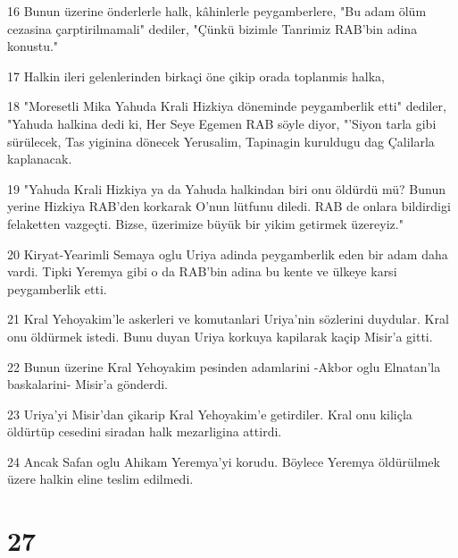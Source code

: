 \par 16 Bunun üzerine önderlerle halk, kâhinlerle peygamberlere, "Bu adam ölüm cezasina çarptirilmamali" dediler, "Çünkü bizimle Tanrimiz RAB'bin adina konustu."
\par 17 Halkin ileri gelenlerinden birkaçi öne çikip orada toplanmis halka,
\par 18 "Moresetli Mika Yahuda Krali Hizkiya döneminde peygamberlik etti" dediler, "Yahuda halkina dedi ki, Her Seye Egemen RAB söyle diyor, "'Siyon tarla gibi sürülecek, Tas yiginina dönecek Yerusalim, Tapinagin kuruldugu dag Çalilarla kaplanacak.
\par 19 "Yahuda Krali Hizkiya ya da Yahuda halkindan biri onu öldürdü mü? Bunun yerine Hizkiya RAB'den korkarak O'nun lütfunu diledi. RAB de onlara bildirdigi felaketten vazgeçti. Bizse, üzerimize büyük bir yikim getirmek üzereyiz."
\par 20 Kiryat-Yearimli Semaya oglu Uriya adinda peygamberlik eden bir adam daha vardi. Tipki Yeremya gibi o da RAB'bin adina bu kente ve ülkeye karsi peygamberlik etti.
\par 21 Kral Yehoyakim'le askerleri ve komutanlari Uriya'nin sözlerini duydular. Kral onu öldürmek istedi. Bunu duyan Uriya korkuya kapilarak kaçip Misir'a gitti.
\par 22 Bunun üzerine Kral Yehoyakim pesinden adamlarini -Akbor oglu Elnatan'la baskalarini- Misir'a gönderdi.
\par 23 Uriya'yi Misir'dan çikarip Kral Yehoyakim'e getirdiler. Kral onu kiliçla öldürtüp cesedini siradan halk mezarligina attirdi.
\par 24 Ancak Safan oglu Ahikam Yeremya'yi korudu. Böylece Yeremya öldürülmek üzere halkin eline teslim edilmedi.

\chapter{27}

